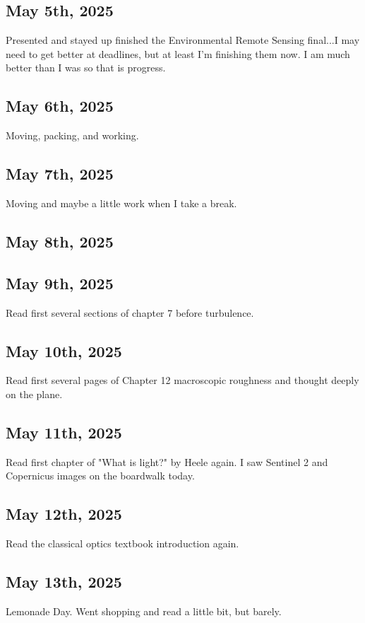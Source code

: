 \documentclass{article}
\begin{document}
\subsection{May 5th, 2025}
Presented and stayed up finished the Environmental Remote Sensing final...I may need to get better at deadlines, but at least I'm finishing them now. I am much better than I was so that is progress. 



\subsection{May 6th, 2025}
Moving, packing, and working. 


\subsection{May 7th, 2025}
Moving and maybe a little work when I take a break. 



\subsection{May 8th, 2025}





\subsection{May 9th, 2025}
Read first several sections of chapter 7 before turbulence.

\subsection{May 10th, 2025}
Read first several pages of Chapter 12 macroscopic roughness and thought deeply on the plane.

\subsection{May 11th, 2025}
Read first chapter of "What is light?" by Heele again. I saw Sentinel 2 and Copernicus images on the boardwalk today.
\subsection{May 12th, 2025}
Read the classical optics textbook introduction again.
\subsection{May 13th, 2025}
Lemonade Day.
Went shopping and read a little bit, but barely. 
\end{document}
